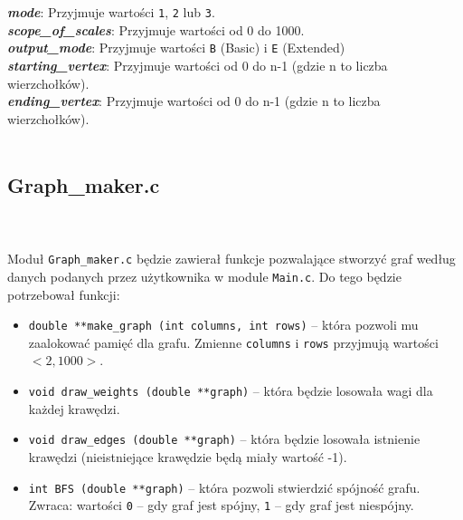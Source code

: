 \documentclass[12pt, a4paper]{article}
\begin{document}
\textbf{\textit{mode}}: Przyjmuje wartości \texttt{1}, \texttt{2} lub \texttt{3}.\\

\textbf{\textit{scope\_of\_scales}}: Przyjmuje wartości od 0 do 1000.\\

\textbf{\textit{output\_mode}}: Przyjmuje wartości \texttt{B} (Basic) i \texttt{E} (Extended)\\

\textbf{\textit{starting\_vertex}}: Przyjmuje wartości od 0 do n-1 (gdzie n to liczba wierzchołków).\\

\textbf{\textit{ending\_vertex}}: Przyjmuje wartości od 0 do n-1 (gdzie n to liczba wierzchołków).\\\\

\subsection{Graph\_maker.c}\\\\
Moduł \texttt{Graph\_maker.c} będzie zawierał funkcje pozwalające stworzyć graf według danych podanych przez użytkownika w module \texttt{Main.c}. Do tego będzie potrzebował funkcji:
\begin{itemize}
    \item \texttt{double **make\_graph (int columns, int rows)} -- która pozwoli mu zaalokować pamięć dla grafu. Zmienne \texttt{columns} i \texttt{rows} przyjmują wartości $<2,1000>$.
    \item \texttt{void draw\_weights (double **graph)} -- która będzie losowała wagi dla każdej krawędzi.
    \item \texttt{void draw\_edges (double **graph)} -- która będzie losowała istnienie krawędzi (nieistniejące krawędzie będą miały wartość -1).
    \item \texttt{int BFS (double **graph)} -- która pozwoli stwierdzić spójność grafu. Zwraca: wartości \texttt{0} -- gdy graf jest spójny, \texttt{1} -- gdy graf jest niespójny.
\end{itemize}
\end{document}
